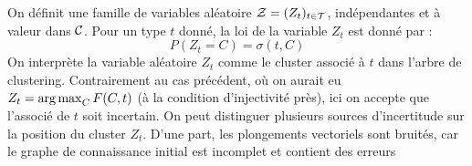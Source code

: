 {On définit une famille de variables aléatoire $\mathcal{Z} = (Z_t)_{t \in \mathcal{T}}$, indépendantes et à valeur dans $\mathcal{C}$. Pour un type $t$ donné, la loi de la variable $Z_t$ est donné par :
\begin{equation}
    P(Z_t = C) = \sigma(t, C)
\end{equation}
On interprète la variable aléatoire $Z_t$ comme le cluster associé à $t$ dans l'arbre de clustering. Contrairement au cas précédent, où on aurait eu $Z_t = \operatorname*{arg\,max}_C F(C, t)$ (à la condition d'injectivité près), ici on accepte que l'associé de $t$ soit incertain. On peut distinguer plusieurs sources d'incertitude sur la position du cluster $Z_t$. D'une part, les plongements vectoriels sont bruités, car le graphe de connaissance initial est incomplet et contient des erreurs}
\fi


